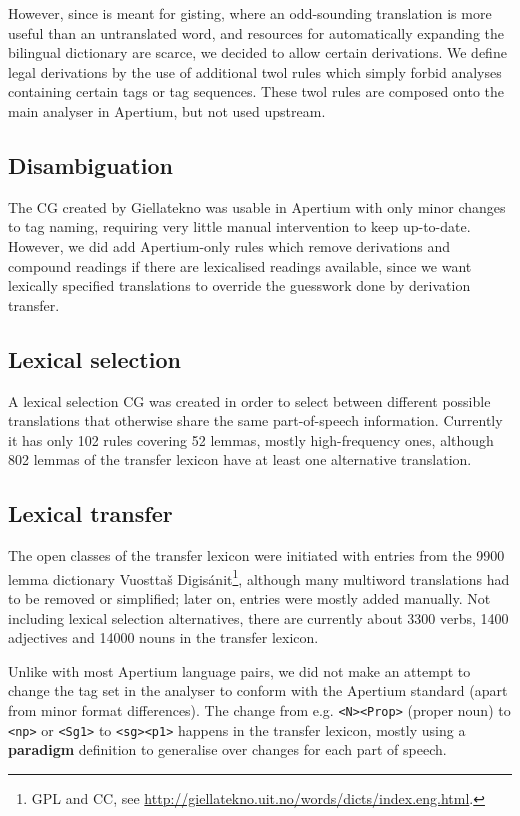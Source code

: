 However, since \smenob{} is meant for gisting, where an odd-sounding
translation is more useful than an untranslated word, and resources
for automatically expanding the bilingual dictionary are scarce, we
decided to allow certain derivations. We define legal derivations by
the use of additional twol rules which simply forbid analyses
containing certain tags or tag sequences. These twol rules are
composed onto the main analyser in Apertium, but not used upstream.

\subsection{Disambiguation}
The CG created by Giellatekno was usable in Apertium with only minor
changes to tag naming, requiring very little manual intervention to
keep up-to-date. However, we did add Apertium-only rules which remove
derivations and compound readings if there are lexicalised readings
available, since we want lexically specified translations to override
the guesswork done by derivation transfer.

\subsection{Lexical selection}
A lexical selection CG was created in order to select between
different possible translations that otherwise share the same
part-of-speech information. Currently it has only 102 rules covering
52 lemmas, mostly high-frequency ones, although 802 lemmas of the
transfer lexicon have at least one alternative translation.

\subsection{Lexical transfer}
The open classes of the transfer lexicon were initiated with entries
from the 9900 lemma dictionary Vuosttaš Digisánit\footnote{GPL and CC,
  see
  \href{http://giellatekno.uit.no/words/dicts/index.eng.html}{http://giellatekno.uit.no/words/dicts/index.eng.html}.},
although many multiword translations had to be removed or simplified;
later on, entries were mostly added manually. Not including lexical
selection alternatives, there are currently about 3300 verbs, 1400
adjectives and 14000 nouns in the transfer lexicon.

Unlike with most Apertium language pairs, we did not make an attempt
to change the tag set in the analyser to conform with the Apertium
standard (apart from minor format differences). The change from e.g.
\texttt{<N><Prop>} (proper noun) to \texttt{<np>} or \texttt{<Sg1>} to
\texttt{<sg><p1>} happens in the transfer lexicon, mostly using a
\textbf{paradigm} definition to generalise over changes for each part
of speech.

